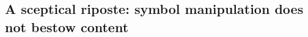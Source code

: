 \documentclass[12pt]{article}
\begin{document}




\subsection{A sceptical riposte: symbol manipulation does not bestow content}
\end{document}
